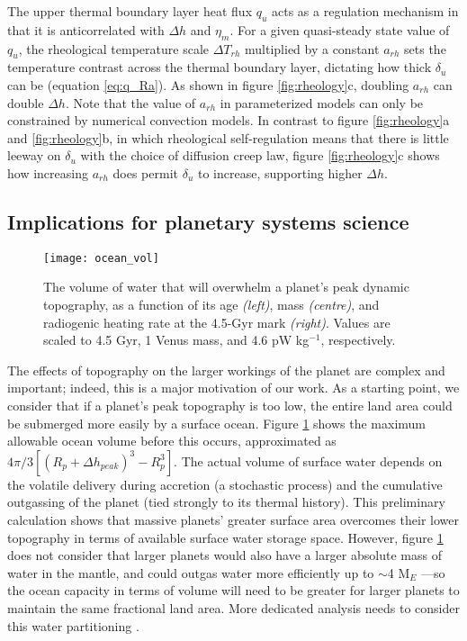 The upper thermal boundary layer heat flux $q_{u}$ acts as a regulation mechanism in that it is anticorrelated with $\Delta h$ and $\eta_m$. For a given quasi-steady state value of $q_{u}$, the rheological temperature scale $\Delta T_{rh}$ multiplied by a constant $a_{rh}$ sets the temperature contrast across the thermal boundary layer, dictating how thick $\delta_{u}$ can be (equation \ref{eq:q_Ra}). As shown in figure \ref{fig:rheology}c, doubling $a_{rh}$ can double $\Delta h$. Note that the value of $a_{rh}$ in parameterized models can only be constrained by numerical convection models. In contrast to figure \ref{fig:rheology}a and \ref{fig:rheology}b, in which rheological self-regulation means that there is little leeway on $\delta_{u}$ with the choice of diffusion creep law, figure \ref{fig:rheology}c shows how increasing $a_{rh}$ does permit $\delta_{u}$ to increase, supporting higher $\Delta h$.



\subsection{Implications for planetary systems science}

\begin{figure}
  \centering
  \texttt{[image: ocean\_vol]}
\caption{The volume of water that will overwhelm a planet's peak dynamic topography, as a function of its age \textit{(left)}, mass \textit{(centre)}, and radiogenic heating rate at the 4.5-Gyr mark \textit{(right)}. Values are scaled to 4.5 Gyr, 1 Venus mass, and 4.6 pW kg$^{-1}$, respectively.}
\label{fig:ocean}
\end{figure}

The effects of topography on the larger workings of the planet are complex and important; indeed, this is a major motivation of our work. As a starting point, we consider that if a planet's peak topography is too low, the entire land area could be submerged more easily by a surface ocean. Figure \ref{fig:ocean} shows the maximum allowable ocean volume before this occurs, approximated as $4\pi/3 \left[(R_p + \Delta h_{peak} )^3 - R_p^3\right]$. The actual volume of surface water depends on the volatile delivery during accretion (a stochastic process) and the cumulative outgassing of the planet (tied strongly to its thermal history). This preliminary calculation shows that massive planets' greater surface area overcomes their lower topography in terms of available surface water storage space. However, figure \ref{fig:ocean} does not consider that larger planets would also have a larger absolute mass of water in the mantle, and could outgas water more efficiently up to $\sim$4 M$_E$ \citep{Noack2014, Tosi2017, Dorn2018a}---so the ocean capacity in terms of volume will need to be greater for larger planets to maintain the same fractional land area. More dedicated analysis needs to consider this water partitioning \citep[e.g.,][]{Cowan2014, Komacek2016}.



